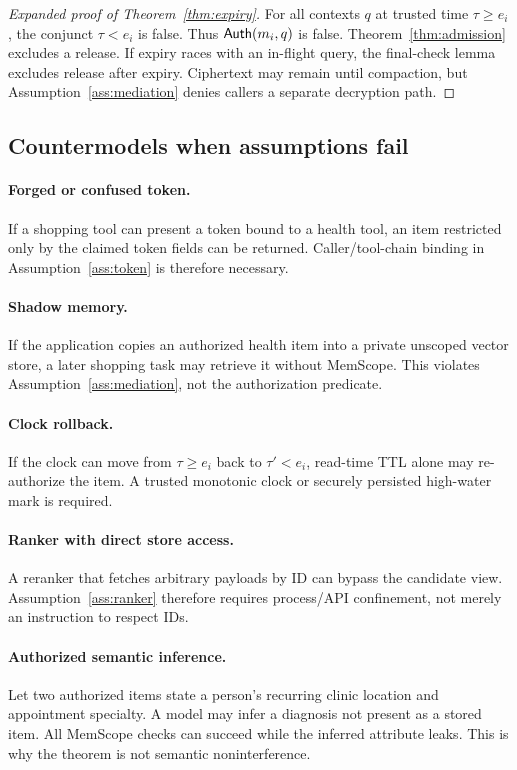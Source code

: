 \begin{proof}[Expanded proof of Theorem~\ref{thm:expiry}]
For all contexts $q$ at trusted time $\tau\ge e_i$, the conjunct $\tau<e_i$ is false. Thus $\mathsf{Auth}(m_i,q)$ is false. Theorem~\ref{thm:admission} excludes a release. If expiry races with an in-flight query, the final-check lemma excludes release after expiry. Ciphertext may remain until compaction, but Assumption~\ref{ass:mediation} denies callers a separate decryption path.
\end{proof}

\subsection{Countermodels when assumptions fail}

\paragraph{Forged or confused token.}
If a shopping tool can present a token bound to a health tool, an item restricted only by the claimed token fields can be returned. Caller/tool-chain binding in Assumption~\ref{ass:token} is therefore necessary.

\paragraph{Shadow memory.}
If the application copies an authorized health item into a private unscoped vector store, a later shopping task may retrieve it without MemScope. This violates Assumption~\ref{ass:mediation}, not the authorization predicate.

\paragraph{Clock rollback.}
If the clock can move from $\tau\ge e_i$ back to $\tau'<e_i$, read-time TTL alone may re-authorize the item. A trusted monotonic clock or securely persisted high-water mark is required.

\paragraph{Ranker with direct store access.}
A reranker that fetches arbitrary payloads by ID can bypass the candidate view. Assumption~\ref{ass:ranker} therefore requires process/API confinement, not merely an instruction to respect IDs.

\paragraph{Authorized semantic inference.}
Let two authorized items state a person's recurring clinic location and appointment specialty. A model may infer a diagnosis not present as a stored item. All MemScope checks can succeed while the inferred attribute leaks. This is why the theorem is not semantic noninterference.

